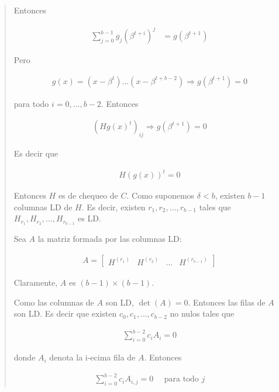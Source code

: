 \documentclass[a4paper]{article}
\begin{document}
\begin{quote}
    Entonces

    \begin{align*}
        \sum_{j=0}^{b-1}g_j \left( \beta^{t+i} \right)^{j} &= g(\beta^{t + 1})
    \end{align*}

    Pero 

    \begin{align*}
        g(x) = (x - \beta^t) \ldots (x - \beta^{t + b -2}) \Rightarrow g(\beta^{t + 1}) = 0
    \end{align*}

    para todo $i =0, \ldots, b - 2$. Entonces 

    \begin{align*}
        \left( Hg(x)^t \right)_{ij} \Rightarrow g(\beta^{t+1}) = 0
    \end{align*}

    Es decir que 

    \begin{align*}
        H(g(x))^t = 0
    \end{align*}

    Entonces $H$ es de chequeo de $C$. Como suponemos $\delta < b$, existen 
    $b - 1$ columnas LD de $H$. Es decir, existen $r_1, r_2, \ldots, r_{b-1}$
    tales que $H_{r_1}, H_{r_2}, \ldots, H_{r_{b-1}}$ es LD.

    Sea $A$ la matriz formada por las columnas LD:

    \begin{align*}
        A = \begin{bmatrix} 
            H^{(r_1)}  & H^{(r_2)} & \ldots & H^{(r_{b-1})}
        \end{bmatrix} 
    \end{align*}

    Claramente, $A$ es $(b-1) \times  (b-1)$. 

    Como las columnas de $A$ son LD, $\det(A) = 0$. Entonces las filas de $A$
    son LD. Es decir que existen $c_0, c_1, \ldots, c_{b-2}$ no nulos tales que 

    \begin{align*}
        \sum_{i=0}^{b - 2} c_i A_i = 0
    \end{align*}

    donde $A_i$ denota la i-ecima fila de $A$. Entonces 

    \begin{align*}
        \sum_{i = 0}^{b- 2} c_i A_{i, j} = 0 ~ ~ ~ ~ ~ ~ \text{para todo } j 
    \end{align*}


\end{quote}
\end{document}
